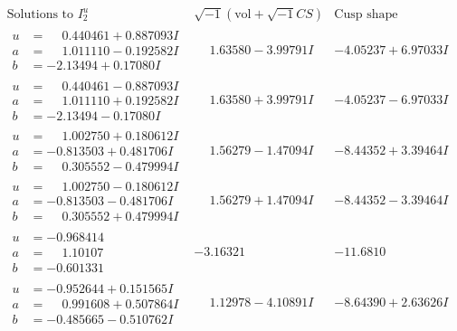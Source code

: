 \documentclass[1p]{elsarticle_modified}
\theoremstyle{definition}
\newcommand{\I}{\sqrt{-1}}
\begin{document}
$$\begin{array}{c|c|c}  
\text{Solutions to }I^u_{2}& \I (\text{vol} + \sqrt{-1}CS) & \text{Cusp shape}\\
 \hline 
\begin{aligned}
u &= \phantom{-}0.440461 + 0.887093 I \\
a &= \phantom{-}1.011110 - 0.192582 I \\
b &= -2.13494 + 0.17080 I\end{aligned}
 & \phantom{-}1.63580 - 3.99791 I & -4.05237 + 6.97033 I \\ \hline\begin{aligned}
u &= \phantom{-}0.440461 - 0.887093 I \\
a &= \phantom{-}1.011110 + 0.192582 I \\
b &= -2.13494 - 0.17080 I\end{aligned}
 & \phantom{-}1.63580 + 3.99791 I & -4.05237 - 6.97033 I \\ \hline\begin{aligned}
u &= \phantom{-}1.002750 + 0.180612 I \\
a &= -0.813503 + 0.481706 I \\
b &= \phantom{-}0.305552 - 0.479994 I\end{aligned}
 & \phantom{-}1.56279 - 1.47094 I & -8.44352 + 3.39464 I \\ \hline\begin{aligned}
u &= \phantom{-}1.002750 - 0.180612 I \\
a &= -0.813503 - 0.481706 I \\
b &= \phantom{-}0.305552 + 0.479994 I\end{aligned}
 & \phantom{-}1.56279 + 1.47094 I & -8.44352 - 3.39464 I \\ \hline\begin{aligned}
u &= -0.968414\phantom{ +0.000000I} \\
a &= \phantom{-}1.10107\phantom{ +0.000000I} \\
b &= -0.601331\phantom{ +0.000000I}\end{aligned}
 & -3.16321\phantom{ +0.000000I} & -11.6810\phantom{ +0.000000I} \\ \hline\begin{aligned}
u &= -0.952644 + 0.151565 I \\
a &= \phantom{-}0.991608 + 0.507864 I \\
b &= -0.485665 - 0.510762 I\end{aligned}
 & \phantom{-}1.12978 - 4.10891 I & -8.64390 + 2.63626 I \\ \hline\begin{aligned}

\end{aligned}
\end{array}$$
\end{document}
